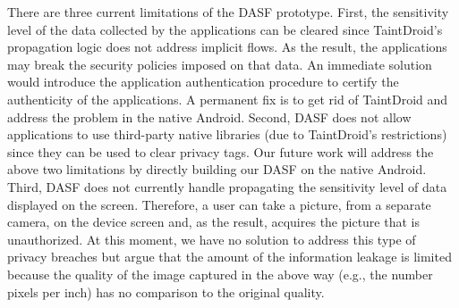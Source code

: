 There are three current limitations of the DASF prototype.  First, 
the sensitivity level of the data collected by the applications can be
cleared since TaintDroid's propagation logic does not address implicit
flows. As the result, the applications may break the security policies
imposed on that data. An immediate solution would introduce the
application authentication procedure to certify the authenticity of the
applications. A permanent fix is to get rid of TaintDroid and address
the problem in the native Android. Second, DASF does not
allow applications to use third-party native libraries (due to
TaintDroid's restrictions) since they can be used to clear privacy
tags.  Our future work will address the above two limitations by
directly building our DASF on the native Android. Third, DASF does not
currently handle propagating the sensitivity level of data displayed
on the screen.  Therefore, a user can take a picture, from a separate
camera, on the device screen and, as the result, acquires the picture
that is unauthorized.  At this moment, we have no solution to address 
this type of privacy breaches but argue that the amount of the
information leakage is limited because the quality of the image
captured in the above way (e.g., the number pixels per inch) has no
comparison to the original quality.
